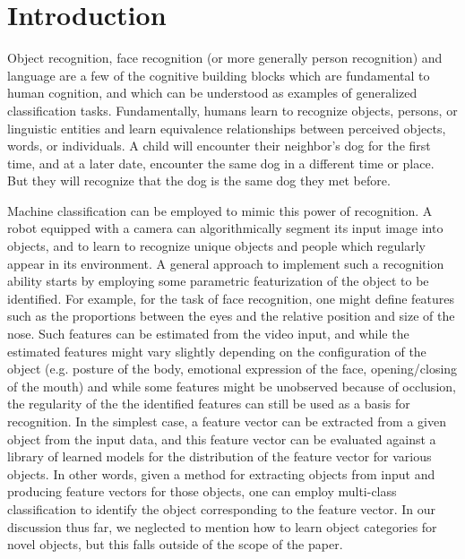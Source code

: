 \documentclass[12pt]{article}
\begin{document}
\maketitle

\newcommand{\tr}{\text{tr}}
\newcommand{\E}{\textbf{E}}
\newcommand{\diag}{\text{diag}}
\newcommand{\argmax}{\text{argmax}}
\newcommand{\Cov}{\text{Cov}}
\newcommand{\Var}{\text{Var}}
\newcommand{\argmin}{\text{argmin}}
\newcommand{\Vol}{\text{Vol}}
\newcommand{\comm}[1]{}

\section{Introduction}

Object recognition, face recognition (or more generally person recognition) and language are a few of
the cognitive building blocks which are fundamental to human cognition, and which can be understood as 
examples of generalized classification tasks.  Fundamentally, humans learn to recognize objects,
persons, or linguistic entities and learn equivalence relationships between perceived objects, words, 
or individuals.  A child will encounter their neighbor's dog for the first time, and at a later date,
encounter the same dog in a different time or place.  But they will recognize that the dog is the same dog
they met before.

Machine classification can be employed to mimic this power of recognition.
A robot equipped with a camera can algorithmically segment its input image into objects,
and to learn to recognize unique objects and people which regularly appear in its environment.
A general approach to implement such a recognition ability starts by employing some
parametric featurization of the object to be identified.  For example, for the task of
face recognition, one might define features such as the proportions between the eyes and the relative position
and size of the nose.  Such features can be estimated from the video input,
and while the estimated features might vary slightly depending on the configuration of the object
(e.g. posture of the body, emotional expression of the face, opening/closing of the mouth)
and while some features might be unobserved because of occlusion,
the regularity of the the identified features can still be used as a basis for recognition.
In the simplest case, a feature vector can be extracted from a given object from the input data,
and this feature vector can be evaluated against a library of learned models
for the distribution of the feature vector for various objects.
In other words, given a method for extracting objects from input and producing feature vectors
for those objects, one can employ multi-class classification to identify the object corresponding to the 
feature vector.  In our discussion thus far, we neglected to mention how to learn
object categories for novel objects, but this falls outside of the scope of the paper.
\end{document}
